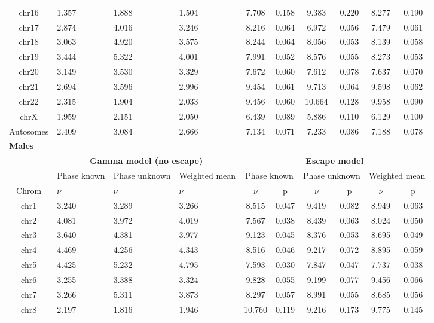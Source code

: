 \begin{table}[!h]
\begin{tabular}{|c|p{1.1cm}p{1.2cm}p{1.3cm}|cccccc|}
    chr16 & 1.357 & 1.888 & 1.504 & 7.708 & 0.158 & 9.383 & 0.220 & 8.277 & 0.190 \\
    chr17 & 2.874 & 4.016 & 3.246 & 8.216 & 0.064 & 6.972 & 0.056 & 7.479 & 0.061 \\
    chr18 & 3.063 & 4.920 & 3.575 & 8.244 & 0.064 & 8.056 & 0.053 & 8.139 & 0.058 \\
    chr19 & 3.444 & 5.322 & 4.001 & 7.991 & 0.052 & 8.576 & 0.055 & 8.273 & 0.053 \\
    chr20 & 3.149 & 3.530 & 3.329 & 7.672 & 0.060 & 7.612 & 0.078 & 7.637 & 0.070 \\
    chr21 & 2.694 & 3.596 & 2.996 & 9.454 & 0.061 & 9.713 & 0.064 & 9.598 & 0.062 \\
    chr22 & 2.315 & 1.904 & 2.033 & 9.456 & 0.060 & 10.664 & 0.128 & 9.958 & 0.090 \\
    chrX & 1.959 & 2.151 & 2.050 & 6.439 & 0.089 & 5.886 & 0.110 & 6.129 & 0.100 \\
    Autosomes & 2.409 & 3.084 & 2.666 & 7.134 & 0.071 & 7.233 & 0.086 & 7.188 & 0.078 \\
    \hline\hline
    \multicolumn{10}{|l|}{\textbf{Males}} \\ \hline
    & \multicolumn{3}{c|}{\textbf{Gamma model (no escape)}} & \multicolumn{6}{c|}{\textbf{Escape model}} \\
    & Phase known & Phase \mbox{unknown} & Weighted mean & 
    \multicolumn{2}{c}{Phase known} & \multicolumn{2}{c}{Phase unknown} & \multicolumn{2}{c|}{Weighted mean} \\
    Chrom & $\nu$ & $\nu$ & $\nu$ & $\nu$ & p & $\nu$ & p & $\nu$ & p \\ \hline
    chr1 & 3.240 & 3.289 & 3.266 & 8.515 & 0.047 & 9.419 & 0.082 & 8.949 & 0.063 \\
    chr2 & 4.081 & 3.972 & 4.019 & 7.567 & 0.038 & 8.439 & 0.063 & 8.024 & 0.050 \\
    chr3 & 3.640 & 4.381 & 3.977 & 9.123 & 0.045 & 8.376 & 0.053 & 8.695 & 0.049 \\
    chr4 & 4.469 & 4.256 & 4.343 & 8.516 & 0.046 & 9.217 & 0.072 & 8.895 & 0.059 \\
    chr5 & 4.425 & 5.232 & 4.795 & 7.593 & 0.030 & 7.847 & 0.047 & 7.737 & 0.038 \\
    chr6 & 3.255 & 3.388 & 3.324 & 9.828 & 0.055 & 9.199 & 0.077 & 9.456 & 0.066 \\
    chr7 & 3.266 & 5.311 & 3.873 & 8.297 & 0.057 & 8.991 & 0.055 & 8.685 & 0.056 \\
    chr8 & 2.197 & 1.816 & 1.946 & 10.760 & 0.119 & 9.216 & 0.173 & 9.775 & 0.145 \\

\end{tabular}
\end{table}
